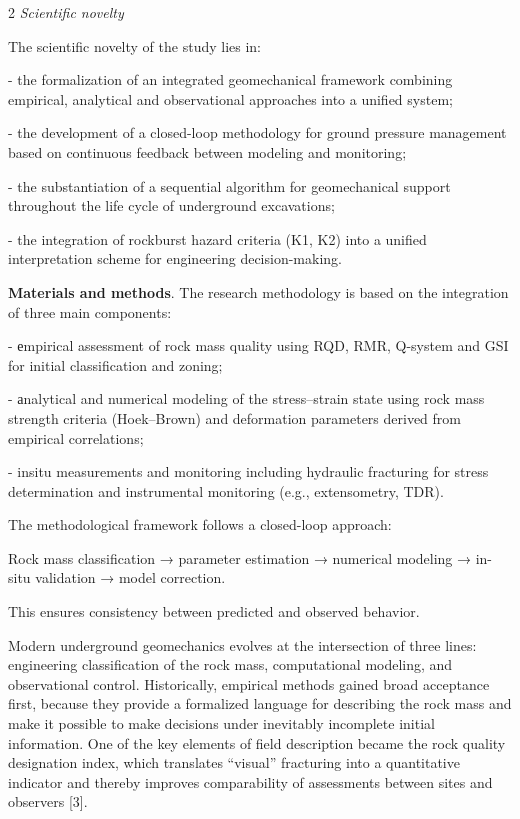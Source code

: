 \begin{multicols}{2}
\emph{Scientific novelty}

The scientific novelty of the study lies in:

- the formalization of an integrated geomechanical framework combining
empirical, analytical and observational approaches into a unified
system;

- the development of a closed-loop methodology for ground pressure
management based on continuous feedback between modeling and monitoring;

- the substantiation of a sequential algorithm for geomechanical support
throughout the life cycle of underground excavations;

- the integration of rockburst hazard criteria (K1, K2) into a unified
interpretation scheme for engineering decision-making.

\textbf{Materials and methods}. The research methodology is based on the
integration of three main components:

- еmpirical assessment of rock mass quality using RQD, RMR, Q-system and
GSI for initial classification and zoning;

- аnalytical and numerical modeling of the stress--strain state using
rock mass strength criteria (Hoek--Brown) and deformation parameters
derived from empirical correlations;

- insitu measurements and monitoring including hydraulic fracturing
for stress determination and instrumental monitoring (e.g.,
extensometry, TDR).

The methodological framework follows a closed-loop approach:

Rock mass classification → parameter estimation → numerical modeling →
in-situ validation → model correction.

This ensures consistency between predicted and observed behavior.

Modern underground geomechanics evolves at the intersection of three
lines: engineering classification of the rock mass, computational
modeling, and observational control. Historically, empirical methods
gained broad acceptance first, because they provide a formalized
language for describing the rock mass and make it possible to make
decisions under inevitably incomplete initial information. One of the
key elements of field description became the rock quality designation
index, which translates ``visual'' fracturing into a quantitative
indicator and thereby improves comparability of assessments between
sites and observers {[}3{]}.


\end{multicols}
